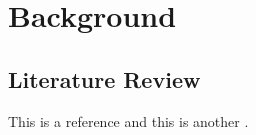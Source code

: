 \section{Background}
\blindtext

\subsection{Literature Review}
\blindtext This is a reference \citet{Elgamal1985} and this is another \citep{Elgamal1985}.